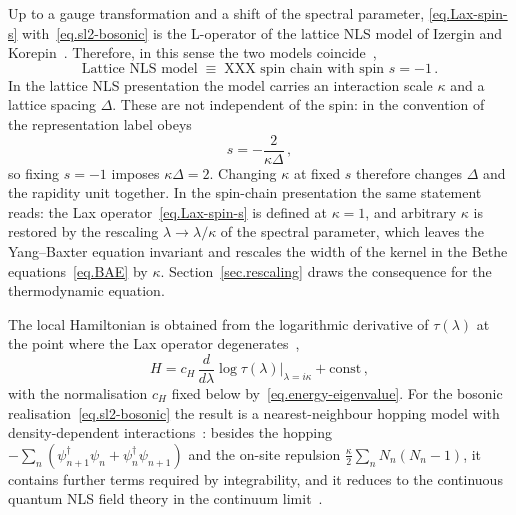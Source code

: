 \documentclass[11pt,a4paper]{article}
\theoremstyle{definition}
\begin{document}
Up to a gauge transformation and a shift of the spectral parameter,
\eqref{eq.Lax-spin-s} with~\eqref{eq.sl2-bosonic} is the L-operator of the
lattice NLS model of Izergin and
Korepin~\cite{IzerginKorepin1981, IzerginKorepin1982, KorepinBogoliubovIzergin1993}. Therefore, in this sense the two models coincide~\cite{HaoEtAl2019, ZhongEtAl2025},
\begin{equation}\label{eq.equivalence}
\text{Lattice NLS model}
  \;\equiv\;
  \text{XXX spin chain with spin $s = -1$}\,.
\end{equation}
In the lattice NLS presentation the model carries an interaction scale
$\kappa$ and a lattice spacing $\Delta$.  These are not independent of the spin:
in the convention of~\cite{HaoEtAl2019} the representation label obeys
\begin{equation}\label{eq.spin-kappa-delta}
  s = -\frac{2}{\kappa\Delta}\,,
\end{equation}
so fixing $s = -1$ imposes $\kappa\Delta = 2$.  Changing
$\kappa$ at fixed $s$ therefore changes $\Delta$ and the rapidity unit together.  
In the spin-chain presentation the same statement reads: the Lax
operator~\eqref{eq.Lax-spin-s} is defined at $\kappa = 1$, and arbitrary
$\kappa$ is restored by the rescaling $\lambda \to \lambda/\kappa$ of the
spectral parameter, which leaves the Yang--Baxter equation invariant and
rescales the width of the kernel in the Bethe equations~\eqref{eq.BAE} by
$\kappa$.  Section~\ref{sec.rescaling} draws the consequence for the
thermodynamic equation.

The local Hamiltonian is obtained from the logarithmic derivative of
$\tau(\lambda)$ at the point where the Lax operator
degenerates~\cite{TarasovTakhtajanFaddeev1983, KorepinBogoliubovIzergin1993},
\begin{equation}\label{eq.H-from-transfer}
  H = c_H\,\frac{d}{d\lambda}\log\tau(\lambda)\Big|_{\lambda = i\kappa}
  + \text{const}\,,
\end{equation}
with the normalisation $c_H$ fixed below by~\eqref{eq.energy-eigenvalue}.
For the bosonic realisation~\eqref{eq.sl2-bosonic} the result is a
nearest-neighbour hopping model with density-dependent
interactions~\cite{TarasovTakhtajanFaddeev1983}: besides the hopping
$-\sum_n(\psi^\dagger_{n+1}\psi_n + \psi^\dagger_n\psi_{n+1})$ and the on-site
repulsion $\frac{\kappa}{2}\sum_n N_n(N_n-1)$, it contains further terms
required by integrability, and it reduces to the continuous quantum NLS field
theory in the continuum
limit~\cite{KorepinBogoliubovIzergin1993, BogoliubovKorepin1986}.  
\end{document}
